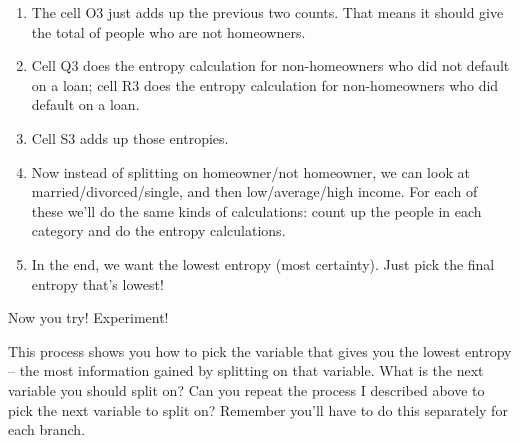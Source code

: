 \documentclass[10pt]{article}
\begin{document}
\begin{enumerate}
\item The cell O3 just adds up the previous two counts. That means it should give the total of people who are not homeowners.
\item Cell Q3 does the entropy calculation for non-homeowners who did not default on a loan; cell R3 does the entropy calculation for non-homeowners who did default on a loan.
\item Cell S3 adds up those entropies.
\item Now instead of splitting on homeowner/not homeowner, we can look at married/divorced/single, and then low/average/high income. For each of these we'll do the same kinds of calculations: count up the people in each category and do the entropy calculations.
\item In the end, we want the lowest entropy (most certainty). Just pick the final entropy that's lowest!
\end{enumerate}

Now you try! Experiment! 

This process shows you how to pick the variable that gives you the lowest entropy -- the most information gained by splitting on that variable. What is the next variable you should split on? Can you repeat the process I described above to pick the next variable to split on? Remember you'll have to do this separately for each branch.




\pagebreak
\end{document}
